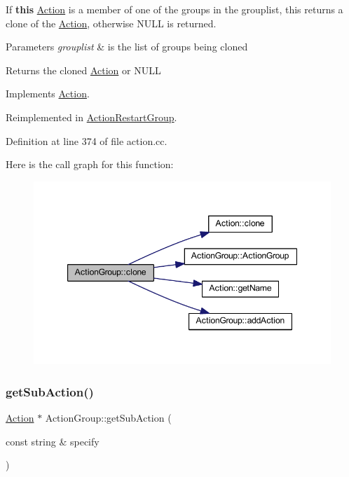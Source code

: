If {\bfseries{this}} \mbox{\hyperlink{class_action}{Action}} is a member of one of the groups in the grouplist, this returns a clone of the \mbox{\hyperlink{class_action}{Action}}, otherwise N\+U\+LL is returned. 
\begin{DoxyParams}{Parameters}
{\em grouplist} & is the list of groups being cloned \\
\hline
\end{DoxyParams}
\begin{DoxyReturn}{Returns}
the cloned \mbox{\hyperlink{class_action}{Action}} or N\+U\+LL 
\end{DoxyReturn}


Implements \mbox{\hyperlink{class_action_af8242e41d09e5df52f97df9e65cc626f}{Action}}.



Reimplemented in \mbox{\hyperlink{class_action_restart_group_a2dd3daab632e0a41e64d9515f47c7200}{Action\+Restart\+Group}}.



Definition at line 374 of file action.\+cc.

Here is the call graph for this function\+:
\nopagebreak
\begin{figure}[H]
\begin{center}
\leavevmode
\includegraphics[width=347pt]{class_action_group_ace0724b13474c6c098eb25aee96dd1d6_cgraph}
\end{center}
\end{figure}
\mbox{\label{class_action_group_a5bf70e0947c75bb1e0c106f436027531}} 
\subsubsection{\texorpdfstring{getSubAction()}{getSubAction()}}
{\footnotesize\ttfamily \mbox{\hyperlink{class_action}{Action}} $\ast$ Action\+Group\+::get\+Sub\+Action (\begin{DoxyParamCaption}\item[{const string \&}]{specify }\end{DoxyParamCaption})\hspace{0.3cm}{\ttfamily [virtual]}}



